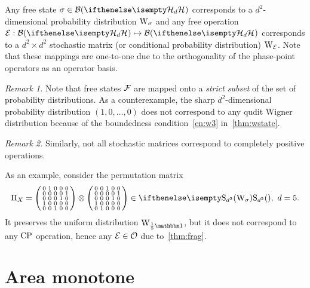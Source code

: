 Any free state $\sigma \in \cal{B}(\hd)$ corresponds to a $d^2$-dimensional probability distribution $\W{\sigma}$ and any free operation $\E: \cal{B}(\hd) \mapsto \cal{B}(\hd)$ corresponds to a $d^2 \times d^2$ stochastic matrix (or conditional probability distribution) $\W{\E}$.
Note that these mappings are one-to-one due to the orthogonality of the phase-point operators as an operator basis.

\emph{Remark 1.} Note that free states $\mathcal{F}$ are mapped onto a \emph{strict subset} of the set of probability distributions.
As a counterexample, the sharp $d^2$-dimensional probability distribution $(1, 0, \dots, 0)$ does not correspond to any qudit Wigner distribution because of the boundedness condition~\ref{en:w3} in~\cref{thm:wstate}.

\emph{Remark 2.} Similarly, not all stochastic matrices correspond to completely positive operations.

As an example, consider the permutation matrix
\begin{equation}
    \Pi_X = \begin{psmallmatrix}
        0 & 1 & 0 & 0 & 0 \\
        0 & 0 & 0 & 0 & 1 \\
        0 & 0 & 0 & 1 & 0 \\
        1 & 0 & 0 & 0 & 0 \\
        0 & 0 & 1 & 0 & 0
    \end{psmallmatrix} \otimes \begin{psmallmatrix}
        0 & 0 & 1 & 0 & 0 \\
        0 & 0 & 0 & 0 & 1 \\
        0 & 0 & 0 & 1 & 0 \\
        1 & 0 & 0 & 0 & 0 \\
        0 & 1 & 0 & 0 & 0    
    \end{psmallmatrix} \in \stochw,\ d=5.
\end{equation}
It preserves the uniform distribution $\W{\frac{1}{5}\id}{}$, but it does not correspond to any ${\rm{CP}}$ operation, hence any $\mathcal{E} \in \mathcal{O}$ due to~\cref{thm:frag}.

\section{Area monotone}
\label{app:areamono}

